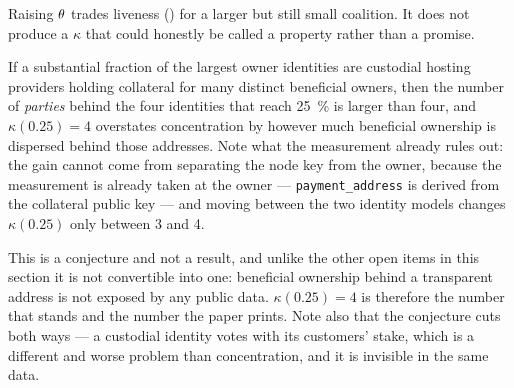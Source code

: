 
\begin{corollary}
\label{cor:23:threshold}
\end{corollary}

Raising $\theta$ trades liveness () for a larger but still small coalition.
It does not produce a $\kappa$ that could honestly be called a property rather than a promise.

\begin{conjecture}
\label{conj:23:custody}
If a substantial fraction of the largest owner identities are custodial hosting providers holding
collateral for many distinct beneficial owners, then the number of \emph{parties} behind the four
identities that reach \SI{25}{\percent} is larger than four, and $\kappa(0.25) = 4$ overstates
concentration by however much beneficial ownership is dispersed behind those addresses. Note what
the measurement already rules out: the gain cannot come from separating the node key from the
owner, because the measurement is already taken at the owner --- \texttt{payment\_address} is
derived from the collateral public key
 --- and moving between the two identity models
changes $\kappa(0.25)$ only between 3 and 4.
\end{conjecture}

This is a conjecture and not a result, and unlike the other open items in this section it is not
convertible into one: beneficial ownership behind a transparent address is not exposed by any public
data. $\kappa(0.25) = 4$ is therefore the number that stands and the number the paper prints. Note
also that the conjecture cuts both ways — a custodial identity votes with its customers' stake,
which is a different and worse problem than concentration, and it is invisible in the same data.

